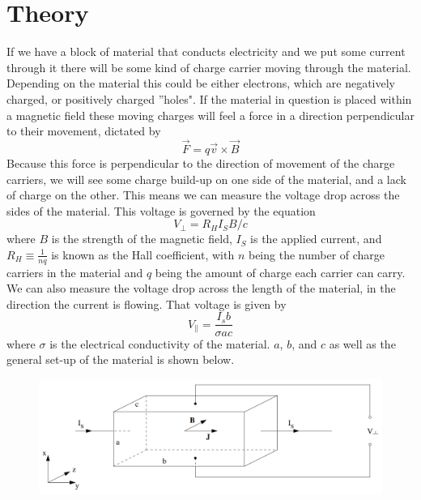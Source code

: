 \documentclass[12pt]{article}
\numberwithin{equation}{section}
\numberwithin{figure}{section}
\numberwithin{table}{section}
\begin{document}
    \section{Theory}\label{sec:Theory}
    If we have a block of material that conducts electricity and we put some current through it 
    there will be some kind of charge carrier moving through the material. Depending on the 
    material this could be either electrons, which are negatively charged, or positively charged 
    ''holes". If the material in question is placed within a magnetic field these moving charges 
    will feel a force in a direction perpendicular to their movement, dictated by 
    \begin{equation}
        \vec{F}=q\vec v\times\vec B
        \label{eqn:Lorentz Force}
    \end{equation}
    Because this force is perpendicular to the direction of movement of the charge carriers, we 
    will see some charge build-up on one side of the material, and a lack of charge on the other. 
    This means we can measure the voltage drop across the sides of the material. This voltage 
    is governed by the equation
    \begin{equation}
        V_\perp=R_H I_S B/c
        \label{eqn:V Perp}
    \end{equation}
    where $B$ is the strength of the magnetic field, $I_S$ is the applied current, and 
    $R_H\equiv \frac{1}{nq}$ is known as the Hall coefficient, with $n$ being the number of 
    charge carriers in the material and $q$ being the amount of charge each carrier can carry. 
    \newline
    We can also measure the voltage drop across the length of the material, in the direction the 
    current is flowing. That voltage is given by 
    \begin{equation}
        V_\parallel=\frac{I_s b}{\sigma a c}
        \label{eqn:V parallel}
    \end{equation}
    where $\sigma$ is the electrical conductivity of the material. $a$, $b$, and $c$ as well 
    as the general set-up of the material is shown below.
    \begin{figure}[H]
        \begin{center}
            \includegraphics[width=.65\textwidth]{MaterialSetup.png}
            \label{fig:MaterialSetup}
        \end{center}
    \end{figure}
\end{document}
